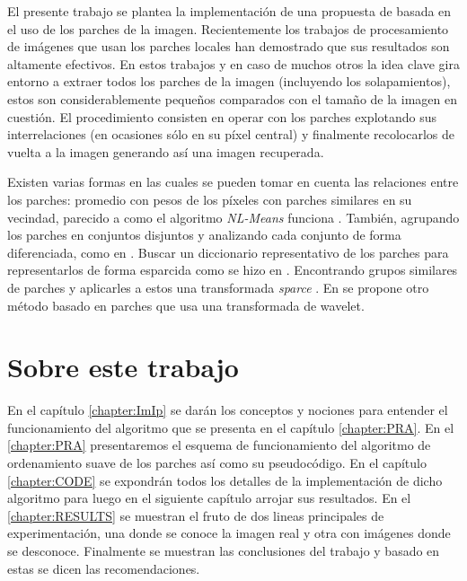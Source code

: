 El presente trabajo se plantea la implementaci\'on de una propuesta de \II\quad basada en el uso de los parches de la imagen. Recientemente los trabajos \cite{buades2005review,chatterjee2009clustering,yu2010image,yu2011solving,dong2011image,dong2011sparsity,zoran2011learning,elad2006image,mairal2007sparse,mairal2009non,zeyde2010single,dabov2007image,li2008patch} de procesamiento de im\'agenes que usan los parches locales han demostrado que sus resultados son altamente efectivos. En estos trabajos y en caso de muchos otros la idea clave gira entorno a extraer todos los parches de la imagen (incluyendo los solapamientos), estos son considerablemente pequeños comparados con el tamaño de la imagen en cuesti\'on. El procedimiento consisten en operar con los parches explotando sus interrelaciones (en ocasiones s\'olo en su p\'ixel central) y finalmente recolocarlos de vuelta a la imagen generando as\'i una imagen recuperada.

Existen varias formas en las cuales se pueden tomar en cuenta las relaciones entre los parches: promedio con pesos de los p\'ixeles con parches similares en su vecindad, parecido a como el algoritmo \textit{NL-Means} funciona \cite{buades2005review}. Tambi\'en, agrupando los parches en conjuntos disjuntos y analizando cada conjunto de forma diferenciada, como en \cite{chatterjee2009clustering,yu2010image,yu2011solving,dong2011image,dong2011sparsity,zoran2011learning}. Buscar un diccionario representativo de los parches para representarlos de forma esparcida como se hizo en \cite{elad2006image,mairal2007sparse,mairal2009non,zeyde2010single}. Encontrando grupos similares de parches y aplicarles a estos una transformada \textit{sparce} \cite{mairal2009non,dabov2007image,li2008patch}. En \cite{ram2011generalized,ram2012redundant} se propone otro m\'etodo basado en parches que usa una transformada de wavelet.

\section*{Sobre este trabajo}

En el cap\'itulo \ref{chapter:ImIp} se dar\'an los conceptos y nociones para entender el funcionamiento del algoritmo que se presenta en el cap\'itulo \ref{chapter:PRA}. En el \ref{chapter:PRA} presentaremos el esquema de funcionamiento del algoritmo de ordenamiento suave de los parches as\'i como su pseudoc\'odigo. En el cap\'itulo \ref{chapter:CODE} se expondr\'an todos los detalles de la implementaci\'on de dicho algoritmo para luego en el siguiente cap\'itulo  arrojar sus resultados. En el \ref{chapter:RESULTS} se muestran el fruto de dos lineas principales de experimentaci\'on, una donde se conoce la imagen real y otra con imágenes donde se desconoce. Finalmente se muestran las conclusiones del trabajo y basado en estas se dicen las recomendaciones.

